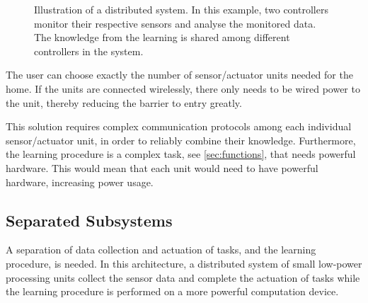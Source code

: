 \begin{figure}[htbp]
\centering
{}
\caption[Distributed system]{Illustration of a distributed system. In this example, two controllers monitor their respective sensors and analyse the monitored data. The knowledge from the learning is shared among different controllers in the system.}\label{fig:distributed_system}
\end{figure}

The user can choose exactly the number of sensor/actuator units needed for the home. If the units are connected wirelessly, there only needs to be wired power to the unit, thereby reducing the barrier to entry greatly.

This solution requires complex communication protocols among each individual sensor/actuator unit, in order to reliably combine their knowledge. Furthermore, the learning procedure is a complex task, see \cref{sec:functions}, that needs powerful hardware. This would mean that each unit would need to have powerful hardware, increasing power usage.

\subsection{Separated Subsystems}
A separation of data collection and actuation of tasks, and the learning procedure, is needed. In this architecture, a distributed system of small low-power processing units collect the sensor data and complete the actuation of tasks while the learning procedure is performed on a more powerful computation device.

